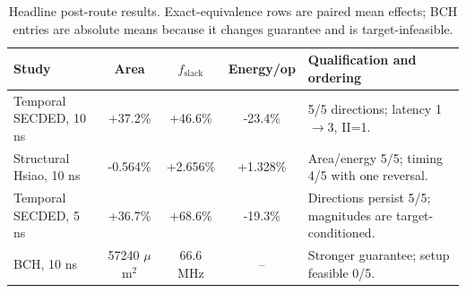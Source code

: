 \begin{table}[t]
\caption{Headline post-route results. Exact-equivalence rows are paired mean effects; BCH entries are absolute means because it changes guarantee and is target-infeasible.}
\label{tab:headline}
\centering\setlength{\tabcolsep}{5.0pt}
\begin{tabular}{@{}lcccp{2.25in}@{}}
\toprule
Study & Area & $f_{\mathrm{slack}}$ & Energy/op & Qualification and ordering \\
\midrule
Temporal SECDED, 10 ns & +37.2\% & +46.6\% & -23.4\% & 5/5 directions; latency 1$\rightarrow$3, II=1. \\
Structural Hsiao, 10 ns & -0.564\% & +2.656\% & +1.328\% & Area/energy 5/5; timing 4/5 with one reversal. \\
Temporal SECDED, 5 ns & +36.7\% & +68.6\% & -19.3\% & Directions persist 5/5; magnitudes are target-conditioned. \\
BCH, 10 ns & 57240 $\mu$m$^2$ & 66.6 MHz & -- & Stronger guarantee; setup feasible 0/5. \\
\bottomrule
\end{tabular}
\end{table}
